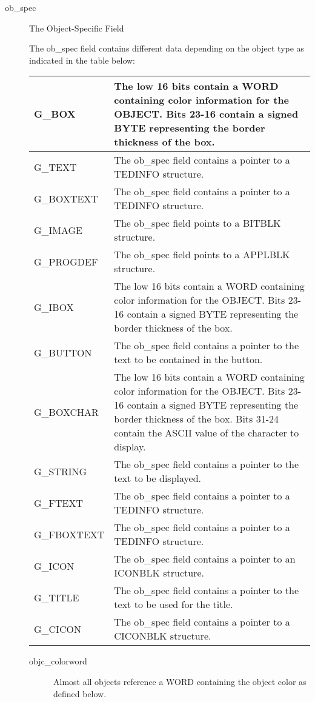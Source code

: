 \begin{description}
\item[ob\_spec] The Object-Specific Field

The ob\_spec field contains different data depending on the object type
as indicated in the table below:
\begin{center}\begin{longtable}{|lp{9cm}|}
\hline
G\_BOX &
The low 16 bits contain a WORD containing color information for the OBJECT. 
Bits 23-16 contain a signed BYTE representing the border thickness of the 
box.\\\hline
G\_TEXT &The ob\_spec field contains a pointer to a TEDINFO  structure. \\\hline  
G\_BOXTEXT &The ob\_spec field contains a pointer to a TEDINFO structure.   \\\hline
G\_IMAGE   & The ob\_spec field points to a BITBLK structure. \\\hline
G\_PROGDEF & The ob\_spec field points to a APPLBLK structure.\\\hline
G\_IBOX	  & The low 16 bits contain a WORD containing color information for the OBJECT. 
Bits 23-16 contain a signed BYTE representing the border thickness of the box.\\\hline
G\_BUTTON  & The ob\_spec field contains a pointer to the text to be contained in the button.\\\hline
G\_BOXCHAR & The low 16 bits contain a WORD containing color information for the OBJECT. 
Bits 23-16 contain a signed BYTE representing the border thickness of the box. 
Bits 31-24 contain the ASCII value of the character to display.\\\hline
G\_STRING  & The ob\_spec field contains a pointer to the text to be displayed.\\\hline
G\_FTEXT   & The ob\_spec field contains a pointer to a TEDINFO structure.\\\hline
G\_FBOXTEXT & The ob\_spec field contains a pointer to a TEDINFO structure.\\\hline
G\_ICON & The ob\_spec field contains a pointer to an ICONBLK structure. \\\hline    
G\_TITLE  & The ob\_spec field contains a pointer to the text to be used for the title.\\\hline
G\_CICON  & The ob\_spec field contains a pointer to a CICONBLK structure.\\\hline
\end{longtable}\end{center}

\begin{description}
\item[objc\_colorword]
Almost all objects reference a WORD containing the object color as
defined below.


\end{description}
\end{description}
